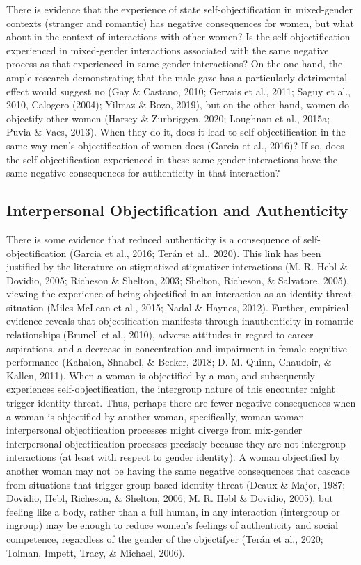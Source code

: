 \documentclass[man]{apa6}
\begin{document}
There is evidence that the experience of state self-objectification in
mixed-gender contexts (stranger and romantic) has negative consequences
for women, but what about in the context of interactions with other
women? Is the self-objectification experienced in mixed-gender
interactions associated with the same negative process as that
experienced in same-gender interactions? On the one hand, the ample
research demonstrating that the male gaze has a particularly detrimental
effect would suggest no (Gay \& Castano, 2010; Gervais et al., 2011;
Saguy et al., 2010, Calogero (2004); Yilmaz \& Bozo, 2019), but on the
other hand, women do objectify other women (Harsey \& Zurbriggen, 2020;
Loughnan et al., 2015a; Puvia \& Vaes, 2013). When they do it, does it
lead to self-objectification in the same way men's objectification of
women does (Garcia et al., 2016)? If so, does the self-objectification
experienced in these same-gender interactions have the same negative
consequences for authenticity in that interaction?

\subsection{Interpersonal Objectification and
Authenticity}\label{interpersonal-objectification-and-authenticity}

There is some evidence that reduced authenticity is a consequence of
self-objectification (Garcia et al., 2016; Terán et al., 2020). This
link has been justified by the literature on stigmatized-stigmatizer
interactions (M. R. Hebl \& Dovidio, 2005; Richeson \& Shelton, 2003;
Shelton, Richeson, \& Salvatore, 2005), viewing the experience of being
objectified in an interaction as an identity threat situation
(Miles-McLean et al., 2015; Nadal \& Haynes, 2012). Further, empirical
evidence reveals that objectification manifests through inauthenticity
in romantic relationships (Brunell et al., 2010), adverse attitudes in
regard to career aspirations, and a decrease in concentration and
impairment in female cognitive performance (Kahalon, Shnabel, \& Becker,
2018; D. M. Quinn, Chaudoir, \& Kallen, 2011). When a woman is
objectified by a man, and subsequently experiences self-objectification,
the intergroup nature of this encounter might trigger identity threat.
Thus, perhaps there are fewer negative consequences when a woman is
objectified by another woman, specifically, woman-woman interpersonal
objectification processes might diverge from mix-gender interpersonal
objectification processes precisely because they are not intergroup
interactions (at least with respect to gender identity). A woman
objectified by another woman may not be having the same negative
consequences that cascade from situations that trigger group-based
identity threat (Deaux \& Major, 1987; Dovidio, Hebl, Richeson, \&
Shelton, 2006; M. R. Hebl \& Dovidio, 2005), but feeling like a body,
rather than a full human, in any interaction (intergroup or ingroup) may
be enough to reduce women's feelings of authenticity and social
competence, regardless of the gender of the objectifyer (Terán et al.,
2020; Tolman, Impett, Tracy, \& Michael, 2006).
\end{document}
